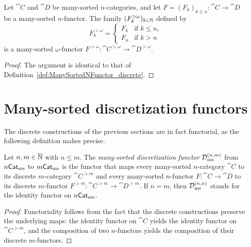 \begin{construction}
  \label{def:ManySortedNFunctor_discreteOmega}
  \leanok
  Let $\cat{C}$ and $\cat{D}$ be many-sorted $n$-categories, and let $F = (F_k)_{k \leq n} \colon
  \cat{C} \to \cat{D}$ be a many-sorted $n$-functor. The family $(F^{>\omega}_k)_{k \in \mathbb{N}}$
  defined by
  \[
    F^{>\omega}_k =
    \begin{cases}
      F_k & \text{if } k \leq n, \\
      F_n & \text{if } k > n
    \end{cases}
  \]
  is a many-sorted $\omega$-functor $F^{>\omega} \colon \cat{C}^{>\omega} \to \cat{D}^{>\omega}$.
\end{construction}

\begin{proof}
  \leanok
  The argument is identical to that of Definition~\ref{def:ManySortedNFunctor_discrete}.
\end{proof}

\section{Many-sorted discretization functors}

The discrete constructions of the previous sections are in fact functorial, as the following
definition makes precise.

\begin{construction}
  \label{def:ManySortedDiscretizationFunctor}
  \leanok
  Let $n, m \in \overline{\mathbb{N}}$ with $n \leq m$. The \emph{many-sorted discretization functor}
  $\operatorname{\mathcal{D}}_{\mathrm{ms}}^{(n, m)}$ from $n\mathsf{Cat}_{\mathrm{ms}}$ to $m\mathsf{Cat}_{\mathrm{ms}}$ is the functor that maps every many-sorted
  $n$-category $\cat{C}$ to its discrete $m$-category $\cat{C}^{>m}$ and every many-sorted
  $n$-functor $F \colon \cat{C} \to \cat{D}$ to its discrete $m$-functor $F^{>m} \colon \cat{C}^{>m}
  \to \cat{D}^{>m}$. If $n = m$, then $\operatorname{\mathcal{D}}_{\mathrm{ms}}^{(n, n)}$ stands for the identity functor on
  $n\mathsf{Cat}_{\mathrm{ms}}$.
\end{construction}

\begin{proof}
  \leanok
  Functoriality follows from the fact that the discrete constructions preserve the underlying maps:
  the identity functor on $\cat{C}$ yields the identity functor on $\cat{C}^{>m}$, and the
  composition of two $n$-functors yields the composition of their discrete $m$-functors.
\end{proof}


